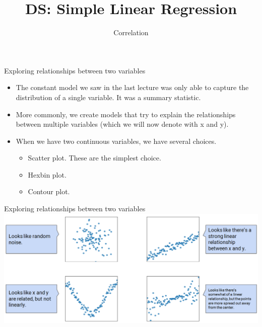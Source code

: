 \documentclass[aspectratio=169]{../latex_main/tntbeamer}  %
\title[Regression]{DS: Simple Linear Regression}
\subtitle{Correlation}
\begin{document}
	
	\maketitle
	\begin{frame}{Exploring relationships between two variables}
	    \begin{itemize}
	        \item The constant model we saw in the last lecture was only able to capture the distribution of a single variable. It was a summary statistic.
	        \item More commonly, we create models that try to explain the relationships between multiple variables (which we will now denote with x and y).
	        \item When we have two continuous variables, we have several choices.
	        \begin{itemize}
	            \item Scatter plot. These are the simplest choice.
	            \item Hexbin plot.
	            \item Contour plot.
	        \end{itemize}
	    \end{itemize}
	\end{frame}
	
	
	\begin{frame}{Exploring relationships between two variables}
	    \includegraphics[scale=.4]{Bild1}
	\end{frame}
	
	
	
\end{document}
